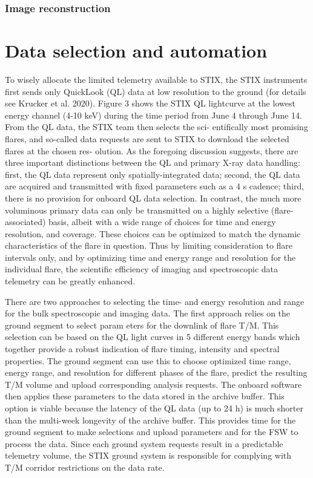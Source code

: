 \documentclass[referee]{aa} %
\begin{document}
\subsubsection{Image reconstruction}


\section{Data selection and automation}
To wisely allocate the limited telemetry available to STIX,
the STIX instruments first sends only QuickLook (QL) data at
low resolution to the ground (for details see Krucker et al. 2020).
Figure 3 shows the STIX QL lightcurve at the lowest energy
channel (4-10 keV) during the time period from June 4 through
June 14. From the QL data, the STIX team then selects the sci-
entifically most promising flares, and so-called data requests are
sent to STIX to download the selected flares at the chosen res-
olution.
As the foregoing discussion suggests,
 there are three important distinctions between the 
 QL and primary X-ray data handling: first, the QL data represent only 
 spatially-integrated data;  second, the QL data are acquired and 
 transmitted with fixed parameters such as a 4 s cadence; third, there is no 
 provision for onboard QL data selection. 
In contrast, the much more voluminous primary data can only 
be transmitted on a highly selective (flare-associated) basis, albeit with a wide range of choices for time and energy
 resolution, and coverage. These choices can be optimized to match the dynamic characteristics of the flare in question.  
  Thus by limiting consideration to flare intervals only, and by optimizing time and energy range and 
 resolution for the individual flare, the scientific efficiency of imaging and spectroscopic data telemetry can be greatly enhanced.


There are two approaches to selecting the time- and energy
resolution and range for the bulk spectroscopic and imaging data.
The first approach relies on the ground segment to select param
eters for the downlink of flare T/M. This selection can be based
on the QL light curves in 5 different energy bands which together
provide a robust indication of flare timing, intensity and spectral
properties. The ground segment can use this to choose optimized
time range, energy range, and resolution for different phases of
the flare, predict the resulting T/M volume and upload corresponding analysis requests.
The onboard software then applies
these parameters to the data stored in the archive buffer. This
option is viable because the latency of the QL data (up to 24 h)
is much shorter than the multi-week longevity of the archive
buffer. This provides time for the ground segment to make selections 
and upload parameters and for the FSW to process the data.
Since each ground system requests result in a predictable telemetry volume, 
the STIX ground system is responsible for complying with T/M corridor restrictions on the data rate.
\end{document}
